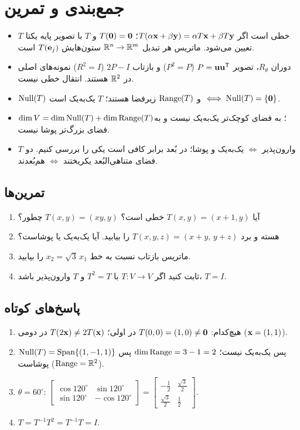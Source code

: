 \section{جمع‌بندی و تمرین}

\begin{summary}
\begin{itemize}
  \item $T$ خطی است اگر $T(\alpha\mathbf{x}+\beta\mathbf{y})=\alpha T\mathbf{x}+\beta T\mathbf{y}$؛ $T(\mathbf{0})=\mathbf{0}$ و $T$ با تصویر پایه یکتا تعیین می‌شود. ماتریس هر تبدیل $\mathbb{R}^n\to\mathbb{R}^m$ ستون‌هایش $T(\mathbf{e}_j)$ است.
  \item دوران $R_\theta$، تصویر $P=\mathbf{u}\mathbf{u}^{\mathsf{T}}$ ($P^2=P$) و بازتاب $2P-I$ ($R^2=I$) نمونه‌های اصلی در $\mathbb{R}^2$ هستند. انتقال خطی نیست.
  \item $\operatorname{Null}(T)$ و $\operatorname{Range}(T)$ زیرفضا هستند؛ $T$ یک‌به‌یک است $\iff\operatorname{Null}(T)=\{\mathbf{0}\}$.
  \item $\dim V=\dim\operatorname{Null}(T)+\dim\operatorname{Range}(T)$؛ به فضای کوچک‌تر یک‌به‌یک نیست و به فضای بزرگ‌تر پوشا نیست.
  \item $T$ وارون‌پذیر $\iff$ یک‌به‌یک و پوشا؛ در بُعد برابر کافی است یکی را بررسی کنیم. دو فضای متناهی‌البُعد یکریختند $\iff$ هم‌بُعدند.
\end{itemize}
\end{summary}

\subsection*{تمرین‌ها}
\begin{enumerate}
  \item آیا $T(x,y)=(x+1,y)$ خطی است؟ $T(x,y)=(xy,y)$ چطور؟
  \item هسته و برد $T(x,y,z)=(x+y,\,y+z)$ را بیابید. آیا یک‌به‌یک یا پوشاست؟
  \item ماتریس بازتاب نسبت به خط $x_2=\sqrt3\,x_1$ را بیابید.
  \item ثابت کنید اگر $T:V\to V$ با $T^2=T$ و $T$ وارون‌پذیر باشد، $T=I$.
\end{enumerate}

\subsection*{پاسخ‌های کوتاه}
\begin{enumerate}
  \item هیچ‌کدام: $T(0,0)=(1,0)\neq\mathbf{0}$ در اولی؛ $T(2\mathbf{x})\neq2T(\mathbf{x})$ در دومی ($\mathbf{x}=(1,1)$).
  \item $\operatorname{Null}(T)=\operatorname{Span}\{(1,-1,1)\}$ پس یک‌به‌یک نیست؛ $\dim\operatorname{Range}=3-1=2$ پس پوشاست ($\operatorname{Range}=\mathbb{R}^2$).
  \item $\theta=60^\circ$: $\begin{bmatrix}\cos120^\circ&\sin120^\circ\\ \sin120^\circ&-\cos120^\circ\end{bmatrix}=\begin{bmatrix}-\frac12&\frac{\sqrt3}2\\ \frac{\sqrt3}2&\frac12\end{bmatrix}$.
  \item $T=T^{-1}T^2=T^{-1}T=I$.
\end{enumerate}
